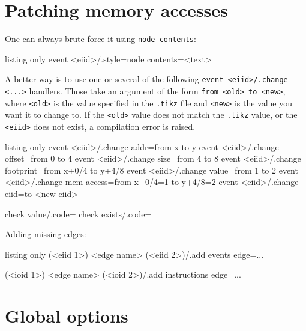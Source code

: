 \documentclass[a4paper]{article}
\begin{document}
\section{Patching memory accesses}\label{sec:patching}
One can always brute force it using \lstinline|node contents|:
\begin{tcblisting}{listing only}
event <eiid>/.style={node contents={<text>}}
\end{tcblisting}
A better way is to use one or several of the following \lstinline|event <eiid>/.change <...>| handlers.
Those take an argument of the form \lstinline|from <old> to <new>|, where \lstinline|<old>| is
the value specified in the \verb|.tikz| file and \lstinline|<new>| is the value you want
it to change to. If the \lstinline|<old>| value does not match the \verb|.tikz| value,
or the \lstinline|<eiid>| does not exist, a compilation error is raised.
\begin{tcblisting}{listing only}
event <eiid>/.change addr=from x to y
event <eiid>/.change offset=from 0 to 4
event <eiid>/.change size=from 4 to 8
event <eiid>/.change footprint=from x+0/4 to y+4/8 %
event <eiid>/.change value=from 1 to 2
event <eiid>/.change mem access={from x+0/4=1 to y+4/8=2} %
event <eiid>/.change eiid=to <new eiid> %

check value/.code={}  %
check exists/.code={} %
\end{tcblisting}


Adding missing edges:
\begin{tcblisting}{listing only}
(<eiid 1>) <edge name> (<eiid 2>)/.add events edge={...}

(<ioid 1>) <edge name> (<ioid 2>)/.add instructions edge={...}
\end{tcblisting}


\section{Global options}\label{sec:global}
\end{document}
